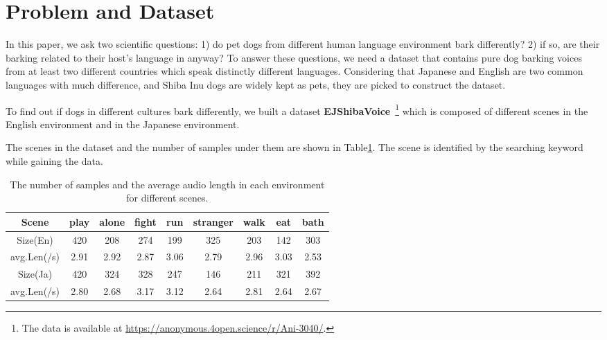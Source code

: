 \section{Problem and Dataset}
\label{sec:assumption}

In this paper, we ask two scientific questions: 1) do pet dogs from different human language environment bark differently? 2) if so, are their barking related to their host's language in anyway? To answer these questions, we need a dataset that contains pure dog barking voices from at least two different countries which speak distinctly different languages. Considering that Japanese and English are two common languages with much difference, and Shiba Inu dogs are widely kept as pets, they are picked to construct the dataset.


To find out if dogs in different cultures bark differently, we built a dataset \textbf{EJShibaVoice}~\footnote{The data is available at \url{https://anonymous.4open.science/r/Ani-3040/}.} which is composed of different scenes in the English environment and in the Japanese environment.

The scenes in the dataset and the number of samples under them are shown in Table\ref{table:keywords}. The scene is identified by the searching keyword while gaining the data.


\begin{table}[h]
    \setlength\tabcolsep{4pt}
	\centering
	\scriptsize
	\begin{tabular}{c|cccccccc}
		\toprule
		Scene & play & alone & fight & run & stranger & walk & eat & bath         \\
		\midrule
	    Size(En)    & 420 & 208 & 274 & 199 & 325 & 203 & 142 & 303     \\
	    avg.Len(/s)  & 2.91 &  2.92 & 2.87 & 3.06 & 2.79 & 2.96 & 3.03& 2.53          \\

		\midrule
		Size(Ja)      & 420 & 324 & 328 & 247 & 146 & 211 & 321 & 392          \\
		avg.Len(/s)    &  2.80 & 2.68 & 3.17 & 3.12 & 2.64 & 2.81 & 2.64& 2.67\\
		\bottomrule
	\end{tabular}
	\caption{The number of samples and the average audio length in each environment for different scenes.}
	\label{table:keywords}
\end{table}

